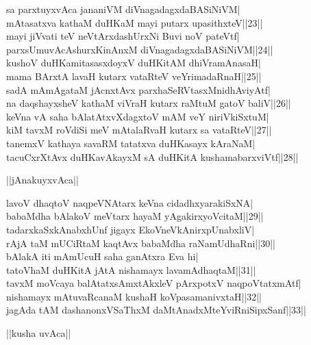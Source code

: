 \documentclass{article}
\begin{document}
sa parxtuyxvAca jananiVM diVnagadagxdaBASiNiVM|\\
mAtasatxva kathaM duHKaM mayi putarx upasithxteV||23||\\
mayi jiVvati teV neVtArxdashUrxNi Buvi noV pateVtf|\\
parxsUmuvAcAshurxKinAnxM diVnagadagxdaBASiNiVM||24||\\
kushoV duHKamitasasxdoyxV duHKitAM dhiVramAnasaH|\\
mama BArxtA lavaH kutarx vataRteV veYrimadaRnaH||25||\\
sadA mAmAgataM jAcnxtAvx parxhaSeRVtasxMnidhAviyAtf|\\
na daqshayxsheV kathaM viVraH kutarx raMtuM gatoV baliV||26||\\
keVna vA saha bAlatAtxvXdagxtoV mAM veY niriVkiSxtuM|\\
kiM tavxM roVdiSi meV mAtalaRvaH kutarx sa vataRteV||27||\\
tanemxV kathaya savaRM tatatxva duHKasayx kAraNaM|\\
tacuCxrXtAvx duHKavAkayxM sA duHKitA kushamabarxviVtf||28||\\

\begin{center}
||jAnakuyxvAca||
\end{center}

lavoV dhaqtoV naqpeVNAtarx keVna cidadhxyarakiSxNA|\\
babaMdha bAlakoV meVtarx hayaM yAgakirxyoVcitaM||29||\\
tadarxkaSxkAnabxhUnf jigayx EkoVneVkAnirxpUnabxliV|\\
rAjA taM mUCiRtaM kaqtAvx babaMdha raNamUdhaRni||30||\\
bAlakA iti mAmUcuH saha ganAtxra Eva hi|\\
tatoVhaM duHKitA jAtA nishamayx lavamAdhaqtaM||31||\\
tavxM moVcaya balAtatxsAmxtAkxleV pArxpotxV naqpoVtatxmAtf|\\
nishamayx mAtuvaRcanaM kushaH koVpasamanivxtaH||32||\\
jagAda tAM dashanonxVSaThxM daMtAnadxMteYviRniSipxSanf||33||\\

\begin{center}
||kusha uvAca||
\end{center}
\end{document}
